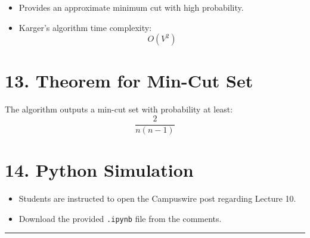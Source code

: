\documentclass[12pt]{article}
\begin{document}
\begin{itemize}
    \item Provides an approximate minimum cut with high probability.
    \item Karger’s algorithm time complexity:
    \[
    O(V^2)
    \]
\end{itemize}

\section*{13. Theorem for Min-Cut Set}

The algorithm outputs a min-cut set with probability at least:
\[
\frac{2}{n(n-1)}
\]

\section*{14. Python Simulation}

\begin{itemize}
    \item Students are instructed to open the Campuswire post regarding Lecture 10.
    \item Download the provided \texttt{.ipynb} file from the comments.
\end{itemize}

\vspace{1em}
\hrule
\end{document}
